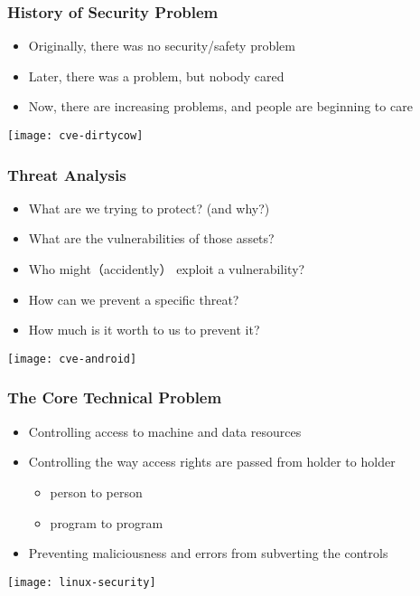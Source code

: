 \begin{frame}[plain]	
	\frametitle{History of Security Problem}
	
\begin{itemize}\Large
	\item Originally, there was no security/safety problem
	\item Later, there was a problem, but nobody cared
	\item Now, there are increasing problems, and people are
	beginning to care
	
	
\end{itemize}	

\centering
\texttt{[image: cve-dirtycow]}
	
\end{frame}

\begin{frame}[plain]	
	\frametitle{Threat Analysis}
	
	\begin{itemize}\large
		\item What are we trying to protect? (and why?)
		\item What are the vulnerabilities of those assets?
		\item Who might（accidently） exploit a vulnerability?
		\item How can we prevent a specific threat?
		\item How much is it worth to us to prevent it?
		
	\end{itemize}	
	
	\centering
	\texttt{[image: cve-android]}
	
\end{frame}

\begin{frame}[plain]	
	\frametitle{The Core Technical Problem}
	
	\begin{itemize}\large
		\item Controlling access to machine and data resources
		\item Controlling the way access rights are passed from
		holder to holder
		\begin{itemize}\large
			\item person to person
			\item program to program
		\end{itemize}
		\item Preventing maliciousness and errors from subverting
		the controls

		
	\end{itemize}	
	
	\centering
	\texttt{[image: linux-security]}
	
\end{frame}

